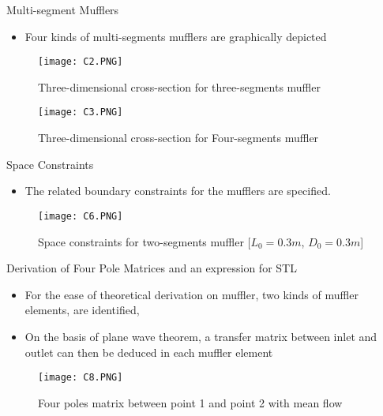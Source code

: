 \documentclass{beamer}
\begin{document}
\begin{frame}{Multi-segment Mufflers}

\begin{itemize}
  \item Four kinds of multi-segments mufflers are graphically depicted
\end{itemize}
\begin{figure}
\texttt{[image: C2.PNG]}
\caption{\label{fig:your-figure2}Three-dimensional cross-section for three-segments muffler}
\end{figure}
\begin{figure}
\texttt{[image: C3.PNG]}
\caption{\label{fig:your-figure3}Three-dimensional cross-section for Four-segments muffler}
\end{figure}

\end{frame}

\begin{frame}{Space Constraints}

\begin{itemize}
  \item The related boundary constraints for the mufflers are specified.
\end{itemize}
\begin{figure}
\texttt{[image: C6.PNG]}
\caption{\label{fig:your-figure4}Space constraints for two-segments muffler [$L_{0}=0.3 m$, $D_{0}=0.3m$]}
\end{figure}
\end{frame}
\begin{frame}{Derivation of Four Pole Matrices and an expression for STL}

\begin{itemize}
  \item For the ease of theoretical derivation on muffler, two kinds of muffler elements, are identified,\item On the basis of plane wave theorem, a transfer matrix between inlet and outlet can then be deduced in each muffler element
\end{itemize}
\vskip 0.1cm

\begin{figure}
\texttt{[image: C8.PNG]}
\caption{\label{fig:your-figure5}Four poles matrix between point 1 and
point 2 with mean flow}
\end{figure}
\end{frame}
\end{document}
